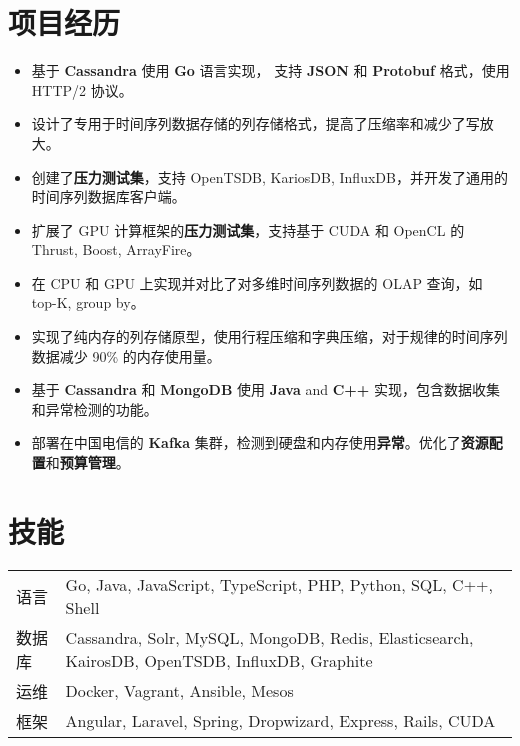 \documentclass[11pt, letterpaper]{simple-cv}
\begin{document}
\section{项目经历}



\begin{itemize}
	\item 基于 \textbf{Cassandra} 使用 \textbf{Go} 语言实现， 支持 \textbf{JSON} 和 \textbf{Protobuf} 格式，使用 HTTP/2 协议。
	\item 设计了专用于时间序列数据存储的列存储格式，提高了压缩率和减少了写放大。
	\item 创建了\textbf{压力测试集}，支持 OpenTSDB, KariosDB, InfluxDB，并开发了通用的时间序列数据库客户端。
\end{itemize}


\begin{itemize}
	\item 扩展了 GPU 计算框架的\textbf{压力测试集}，支持基于 CUDA 和 OpenCL 的 Thrust, Boost, ArrayFire。
	\item 在 CPU 和 GPU 上实现并对比了对多维时间序列数据的 OLAP 查询，如 top-K, group by。
	\item 实现了纯内存的列存储原型，使用行程压缩和字典压缩，对于规律的时间序列数据减少 90\% 的内存使用量。
\end{itemize}


\begin{itemize}
	\item 基于 \textbf{Cassandra} 和 \textbf{MongoDB} 使用 \textbf{Java} and \textbf{C++} 实现，包含数据收集和异常检测的功能。
	\item 部署在中国电信的 \textbf{Kafka} 集群，检测到硬盘和内存使用\textbf{异常}。优化了\textbf{资源配置}和\textbf{预算管理}。
\end{itemize}

\section{技能}
\begin{tabular}{ l l }
	语言   & Go, Java, JavaScript, TypeScript, PHP, Python, SQL, C++, Shell                                \\
	数据库 & Cassandra, Solr, MySQL, MongoDB, Redis, Elasticsearch, KairosDB, OpenTSDB, InfluxDB, Graphite \\
	运维   & Docker, Vagrant, Ansible, Mesos                                                               \\
	框架   & Angular, Laravel, Spring, Dropwizard, Express, Rails, CUDA
\end{tabular}
\end{document}
